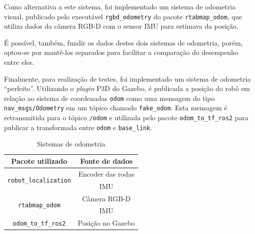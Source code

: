 \documentclass[repeatfields,xlists,xpacks,oneside,yearsonly]{ufrgscca}
\begin{document}

Como alternativa a este sistema, foi implementado um sistema de odometria visual,
publicado pelo executável \texttt{rgbd\_odometry} do pacote 
\texttt{rtabmap\_odom}, que utiliza dados da câmera RGB-D com
o sensor IMU para estimava da posição.

É possível, também, fundir os dados destes dois sistemas de odometria, 
porém, optou-se por mantê-los separados para facilitar a comparação
do desempenho entre eles.

Finalmente, para realização de testes, foi implementado um sistema de odometria 
“perfeito”. 
Utilizando o \textit{plugin} P3D do Gazebo, é publicada a posição
do robô em relação ao sistema de coordenadas \texttt{odom} como uma mensagem
do tipo \texttt{nav\_msgs/Odometry} em um tópico chamado \texttt{fake\_odom}.
Esta mensagem é retransmitida para o tópico \texttt{/odom} e utilizada pelo
pacote \texttt{odom\_to\_tf\_ros2} para publicar a transformada entre
\texttt{odom} e \texttt{base\_link}.


\begin{table}[h]
    \begin{center}
    \caption{Sistemas de odometria}
    \label{tab:odometria}
    \begin{tabular}{c|c}
    \hline
    Pacote utilizado & Fonte de dados \\
    \hline
    \multirow{2}{*}{\texttt{robot\_localization}} & Encoder das rodas \\ \cline{2-2}
                                 & IMU	\\
    \hline
    \multirow{2}{*}{\texttt{rtabmap\_odom}} & Câmera RGB-D \\ \cline{2-2}
                                            & IMU  	\\
    \hline
    \texttt{odom\_to\_tf\_ros2} & Posição no Gazebo	\\
    \hline
    \end{tabular}
\end{center}
{}
\end{table}
\end{document}
